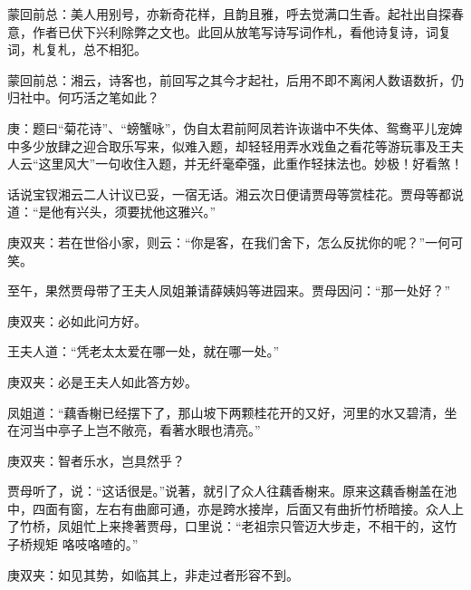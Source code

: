 
\begin{parag}
    \begin{note}蒙回前总：美人用别号，亦新奇花样，且韵且雅，呼去觉满口生香。起社出自探春意，作者已伏下兴利除弊之文也。此回从放笔写诗写词作札，看他诗复诗，词复词，札复札，总不相犯。\end{note}
\end{parag}


\begin{parag}
    \begin{note}蒙回前总：湘云，诗客也，前回写之其今才起社，后用不即不离闲人数语数折，仍归社中。何巧活之笔如此？\end{note}
\end{parag}


\begin{parag}
    \begin{note}庚：题曰“菊花诗”、“螃蟹咏”，伪自太君前阿凤若许诙谐中不失体、鸳鸯平儿宠婢中多少放肆之迎合取乐写来，似难入题，却轻轻用弄水戏鱼之看花等游玩事及王夫人云“这里风大”一句收住入题，并无纤毫牵强，此重作轻抹法也。妙极！好看煞！\end{note}
\end{parag}


\begin{parag}
    话说宝钗湘云二人计议已妥，一宿无话。湘云次日便请贾母等赏桂花。贾母等都说道：“是他有兴头，须要扰他这雅兴。”\begin{note}庚双夹：若在世俗小家，则云：“你是客，在我们舍下，怎么反扰你的呢？”一何可笑。\end{note}至午，果然贾母带了王夫人凤姐兼请薛姨妈等进园来。贾母因问：“那一处好？”\begin{note}庚双夹：必如此问方好。\end{note}王夫人道：“凭老太太爱在哪一处，就在哪一处。”\begin{note}庚双夹：必是王夫人如此答方妙。\end{note}凤姐道：“藕香榭已经摆下了，那山坡下两颗桂花开的又好，河里的水又碧清，坐在河当中亭子上岂不敞亮，看著水眼也清亮。”\begin{note}庚双夹：智者乐水，岂具然乎？\end{note}贾母听了，说：“这话很是。”说著，就引了众人往藕香榭来。原来这藕香榭盖在池中，四面有窗，左右有曲廊可通，亦是跨水接岸，后面又有曲折竹桥暗接。众人上了竹桥，凤姐忙上来搀著贾母，口里说：“老祖宗只管迈大步走，不相干的，这竹子桥规矩 咯吱咯喳的。”\begin{note}庚双夹：如见其势，如临其上，非走过者形容不到。\end{note}
\end{parag}


